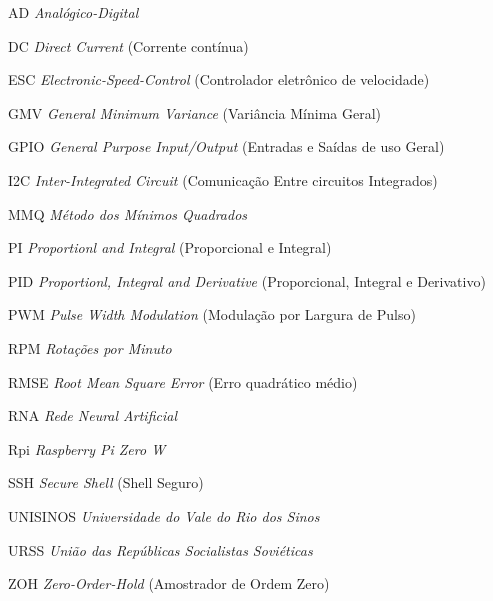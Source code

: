 \listoffigures*
\cleardoublepage
\listoftables*
\cleardoublepage
\begin{siglas}
\item[AD] \textit{Analógico-Digital}
\item[DC]  \textit{Direct Current} (Corrente contínua)
\item[ESC]  \textit{Electronic-Speed-Control} (Controlador eletrônico de velocidade)
\item[GMV]  \textit{General Minimum Variance} (Variância Mínima Geral)
\item[GPIO]  \textit{General Purpose Input/Output} (Entradas e Saídas de uso Geral)
\item[I2C]  \textit{Inter-Integrated Circuit} (Comunicação Entre circuitos Integrados)
\item[MMQ]  \textit{Método dos Mínimos Quadrados}
\item[PI] \textit{Proportionl and Integral} (Proporcional e Integral)
\item[PID] \textit{Proportionl, Integral and Derivative} (Proporcional, Integral e Derivativo)
\item[PWM]  \textit{Pulse Width Modulation} (Modulação por Largura de Pulso)
\item[RPM]  \textit{Rotações por Minuto}
\item[RMSE]  \textit{Root Mean Square Error} (Erro quadrático médio)
\item[RNA]  \textit{Rede Neural Artificial}
\item[Rpi]  \textit{Raspberry Pi Zero W}
\item[SSH]  \textit{Secure Shell} (Shell Seguro)
\item[UNISINOS]  \textit{Universidade do Vale do Rio dos Sinos}
\item[URSS]  \textit{União das Repúblicas Socialistas Soviéticas}
\item[ZOH]  \textit{Zero-Order-Hold} (Amostrador de Ordem Zero)

\end{siglas}
